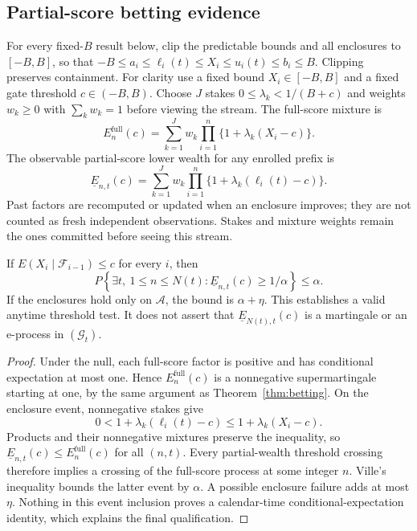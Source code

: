 \subsection{Partial-score betting evidence}

For every fixed-$B$ result below, clip the predictable bounds and all
enclosures to $[-B,B]$, so that $-B\leq a_i\leq\ell_i(t)\leq
X_i\leq u_i(t)\leq b_i\leq B$. Clipping preserves containment.
For clarity use a fixed bound $X_i\in[-B,B]$ and a fixed gate threshold
$c\in(-B,B)$. Choose $J$ stakes
$0\leq\lambda_k<1/(B+c)$ and weights $w_k\geq0$ with
$\sum_kw_k=1$ before viewing the stream. The full-score mixture is
\[
 E_n^{\mathrm{full}}(c)=
 \sum_{k=1}^{J}w_k\prod_{i=1}^n\{1+\lambda_k(X_i-c)\}.
\]
The observable partial-score lower wealth for any enrolled prefix is
\begin{equation}
 \underline E_{n,t}(c)=
 \sum_{k=1}^{J}w_k\prod_{i=1}^n
                      \{1+\lambda_k(\ell_i(t)-c)\}.
 \label{eq:async_wealth}
\end{equation}
Past factors are recomputed or updated when an enclosure improves; they
are not counted as fresh independent observations. Stakes and mixture
weights remain the ones committed before seeing this stream.

\begin{theorem}
\label{thm:async_betting}
If $E(X_i\mid\mathcal F_{i-1})\leq c$ for every $i$, then
\[
 P\left\{\exists t,\ 1\leq n\leq N(t):
             \underline E_{n,t}(c)\geq1/\alpha\right\}\leq\alpha.
\]
If the enclosures hold only on $\mathcal A$, the bound is $\alpha+\eta$.
This establishes a valid anytime threshold test. It does not assert that
$\underline E_{N(t),t}(c)$ is a martingale or an e-process in
$(\mathcal G_t)$.
\end{theorem}
\begin{proof}
Under the null, each full-score factor is positive and has conditional
expectation at most one. Hence $E_n^{\mathrm{full}}(c)$ is a
nonnegative supermartingale starting at one, by the same argument as
Theorem~\ref{thm:betting}. On the enclosure event, nonnegative stakes
give
\[
 0<1+\lambda_k(\ell_i(t)-c)
 \leq1+\lambda_k(X_i-c).
\]
Products and their nonnegative mixtures preserve the inequality, so
$\underline E_{n,t}(c)\leq E_n^{\mathrm{full}}(c)$ for all $(n,t)$.
Every partial-wealth threshold crossing therefore implies a crossing of
the full-score process at some integer $n$. Ville's inequality bounds
the latter event by $\alpha$. A possible enclosure failure adds at most
$\eta$. Nothing in this event inclusion proves a calendar-time
conditional-expectation identity, which explains the final qualification.
\end{proof}

